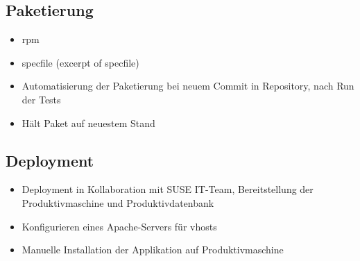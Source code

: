 \subsection{Paketierung}
\label{sec:Paketierung}
\begin{itemize}
	\item rpm
	\item specfile (excerpt of specfile)
	\item Automatisierung der Paketierung bei neuem Commit in Repository, nach Run der Tests
	\item Hält Paket auf neuestem Stand
\end{itemize}

\subsection{Deployment}
\label{sec:Deployment}
\begin{itemize}
	\item Deployment in Kollaboration mit SUSE IT-Team, Bereitstellung der Produktivmaschine und
	Produktivdatenbank
	\item Konfigurieren eines Apache-Servers für vhosts
	\item Manuelle Installation der Applikation auf Produktivmaschine
\end{itemize}

